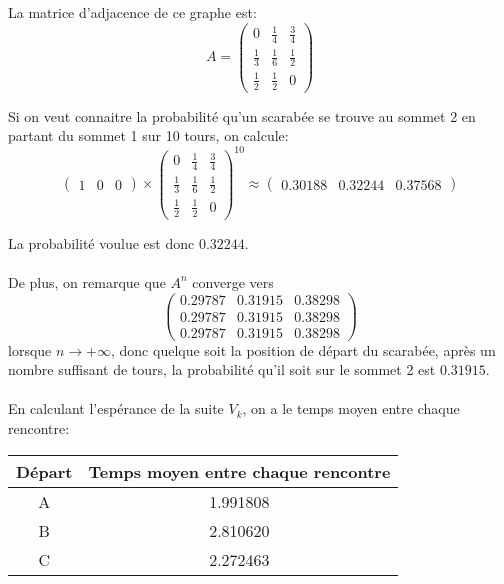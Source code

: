     La matrice d'adjacence de ce graphe est:
      \[A = \left(\begin{array}{ccc}
        0 & \frac 1 4 & \frac 3 4 \\
        \frac 1 3 & \frac 1 6 & \frac 1 2 \\
        \frac 1 2 & \frac 1 2 & 0
      \end{array}\right)\]

    Si on veut connaitre la probabilité qu'un scarabée se trouve au sommet 2 en
    partant du sommet 1 sur 10 tours, on calcule:
      \[
        \left(\begin{array}{ccc}
          1 & 0 & 0
        \end{array}\right)
        \times
        \left(\begin{array}{ccc}
          0 & \frac 1 4 & \frac 3 4 \\
          \frac 1 3 & \frac 1 6 & \frac 1 2 \\
          \frac 1 2 & \frac 1 2 & 0
        \end{array}\right)^{10}
        \approx
        \left(\begin{array}{ccc}
          0.30188 & 0.32244 & 0.37568
        \end{array}\right)
      \]

    La probabilité voulue est donc $0.32244$.

    \paragraph{}
    De plus, on remarque que $A^n$ converge vers
      \[
        \left(\begin{array}{ccc}
          0.29787 & 0.31915 & 0.38298 \\
          0.29787 & 0.31915 & 0.38298 \\
          0.29787 & 0.31915 & 0.38298
        \end{array}\right)
      \]
    lorsque $n \to +\infty$, donc quelque soit la position de départ du
    scarabée, après un nombre suffisant de tours, la probabilité qu'il soit sur
    le sommet 2 est $0.31915$.

    \paragraph{}
    En calculant l'espérance de la suite $V_k$, on a le temps moyen entre chaque
    rencontre:

    \begin{center}
      \begin{tabular}{|c|c|}
        \hline
        Départ & Temps moyen entre chaque rencontre \\\hline
        A      & 1.991808 \\\hline
        B      & 2.810620 \\\hline
        C      & 2.272463 \\\hline
      \end{tabular}
    \end{center}

